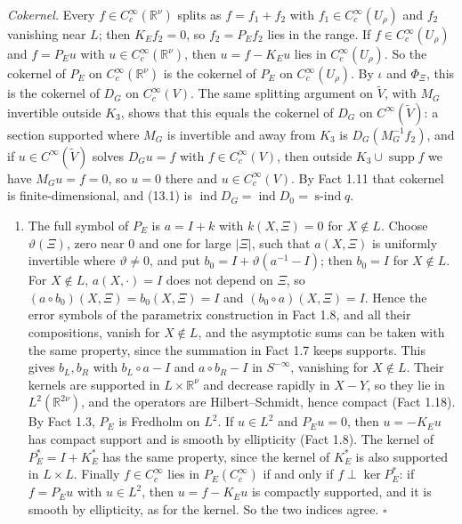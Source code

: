 \documentclass[
  11pt,
]{article}
\providecommand{\tightlist}{%
  \setlength{\itemsep}{0pt}\setlength{\parskip}{0pt}}
\begin{document}
\emph{Cokernel.} Every \(f\in C_c^\infty(\mathbb R^\nu)\) splits as
\(f=f_1+f_2\) with \(f_1\in C_c^\infty(U_\rho)\) and \(f_2\) vanishing
near \(L\); then \(K_Ef_2=0\), so \(f_2=P_Ef_2\) lies in the range. If
\(f\in C_c^\infty(U_\rho)\) and \(f=P_Eu\) with
\(u\in C_c^\infty(\mathbb R^\nu)\), then \(u=f-K_Eu\) lies in
\(C_c^\infty(U_\rho)\). So the cokernel of \(P_E\) on
\(C_c^\infty(\mathbb R^\nu)\) is the cokernel of \(P_E\) on
\(C_c^\infty(U_\rho)\). By \(\iota\) and \(\Phi_\Xi\), this is the
cokernel of \(D_G\) on \(C_c^\infty(V)\). The same splitting argument on
\(\tilde V\), with \(M_G\) invertible outside \(K_3\), shows that this
equals the cokernel of \(D_G\) on \(C^\infty(\tilde V)\): a section
supported where \(M_G\) is invertible and away from \(K_3\) is
\(D_G(M_G^{-1}f_2)\), and if \(u\in C^\infty(\tilde V)\) solves
\(D_Gu=f\) with \(f\in C_c^\infty(V)\), then outside
\(K_3\cup\operatorname{supp}f\) we have \(M_Gu=f=0\), so \(u=0\) there
and \(u\in C_c^\infty(V)\). By Fact 1.11 that cokernel is
finite-dimensional, and (13.1) is
\(\operatorname{ind}D_G=\operatorname{ind}D_0=\operatorname{s-ind}q\).

\begin{enumerate}
\def\labelenumi{(\arabic{enumi})}
\setcounter{enumi}{2}
\tightlist
\item
  The full symbol of \(P_E\) is \(a=I+k\) with \(k(X,\Xi)=0\) for
  \(X\notin L\). Choose \(\vartheta(\Xi)\), zero near \(0\) and one for
  large \(|\Xi|\), such that \(a(X,\Xi)\) is uniformly invertible where
  \(\vartheta\ne0\), and put \(b_0=I+\vartheta(a^{-1}-I)\); then
  \(b_0=I\) for \(X\notin L\). For \(X\notin L\), \(a(X,\cdot)=I\) does
  not depend on \(\Xi\), so \((a\circ b_0)(X,\Xi)=b_0(X,\Xi)=I\) and
  \((b_0\circ a)(X,\Xi)=I\). Hence the error symbols of the parametrix
  construction in Fact 1.8, and all their compositions, vanish for
  \(X\notin L\), and the asymptotic sums can be taken with the same
  property, since the summation in Fact 1.7 keeps supports. This gives
  \(b_L,b_R\) with \(b_L\circ a-I\) and \(a\circ b_R-I\) in
  \(S^{-\infty}\), vanishing for \(X\notin L\). Their kernels are
  supported in \(L\times\mathbb R^\nu\) and decrease rapidly in \(X-Y\),
  so they lie in \(L^2(\mathbb R^{2\nu})\), and the operators are
  Hilbert--Schmidt, hence compact (Fact 1.18). By Fact 1.3, \(P_E\) is
  Fredholm on \(L^2\). If \(u\in L^2\) and \(P_Eu=0\), then \(u=-K_Eu\)
  has compact support and is smooth by ellipticity (Fact 1.8). The
  kernel of \(P_E^*=I+K_E^*\) has the same property, since the kernel of
  \(K_E^*\) is also supported in \(L\times L\). Finally
  \(f\in C_c^\infty\) lies in \(P_E(C_c^\infty)\) if and only if
  \(f\perp\ker P_E^*\): if \(f=P_Eu\) with \(u\in L^2\), then
  \(u=f-K_Eu\) is compactly supported, and it is smooth by ellipticity,
  as for the kernel. So the two indices agree. \(\square\)
\end{enumerate}
\end{document}
